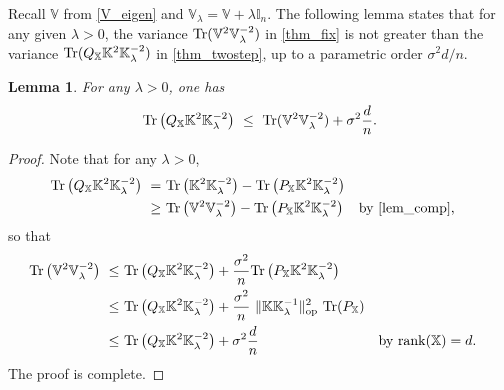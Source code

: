 \documentclass[11pt,twoside]{article}
\newtheorem{lemma}{Lemma}
\def\VV{\mathbb{V}}
\def\KK{\mathbb{K}}
\def\II{\mathbb{I}}
\def\XX{\mathbb{X}}
\def\tr{{\rm Tr}}
\def\op{{\rm op}}
\def\l{\left}
\def\r{\right}
\newcommand{\rank}{\ensuremath{{\rm rank}}}
\begin{document}
Recall $\VV$ from  \eqref{V_eigen} and $\VV_\lambda = \VV + \lambda \II_n$. 
The following lemma states that for any given $\lambda>0$, 
the variance  $ \tr(\VV^2\VV^{-2}_\lambda) $ in \cref{thm_fix} is not greater than the variance $\tr(Q_{\XX} \KK^2 \KK_{\lambda}^{-2})$ in \cref{thm_twostep}, up to a parametric order $ {\sigma^2 d / n}$. 
\begin{lemma}\label{lem_var_com}
For any $\lambda>0$, one has 
    \[
\tr\l( Q_{\XX} \KK^2 \KK_{\lambda}^{-2} \r)  ~\le ~    \tr(\VV^2\VV^{-2}_\lambda)  + \sigma^2  { d \over n}. 
    \]
\end{lemma}
\begin{proof}
Note that  for any $\lambda>0$, 
\begin{align*}
\tr\l(Q_{\XX} \KK^2 \KK_{\lambda}^{-2} \r)  ~  = ~  &   \tr\l( \KK^2 \KK_{\lambda}^{-2}  \r) -  \tr\l(   P_{\XX}  \KK^2 \KK_{\lambda}^{-2} \r)   \\
 ~ \ge ~   &   \tr\l( \VV^2 \VV_\lambda^{-2} \r)    -   \tr\l( P_{\XX}  \KK^2 \KK_{\lambda}^{-2} \r) &&\text{by  \cref{lem_comp},} 
\end{align*}
so that 
\begin{align*}
 \tr\l( \VV^2 \VV_\lambda^{-2} \r)    ~ \le ~&  \tr\l(Q_{\XX} \KK^2 \KK_{\lambda}^{-2} \r)   + {\sigma^2  \over n}   \tr\l( P_{\XX}  \KK^2 \KK_{\lambda}^{-2} \r)   \\
~ \le ~&    \tr\l(Q_{\XX} \KK^2 \KK_{\lambda}^{-2} \r)  +  {\sigma^2  \over n} ~ \|\KK\KK_{\lambda} ^{-1} \|_\op^2~  \tr(P_{\XX})  \\
~ \le ~&    \tr\l(Q_{\XX} \KK^2 \KK_{\lambda}^{-2} \r)  +\sigma^2   { d \over n} &&\text{by $\rank(\XX) =d$}.
\end{align*}
The proof is complete. 
\end{proof}
\end{document}
